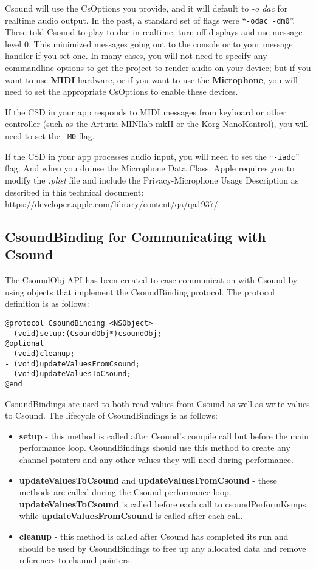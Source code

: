 \documentclass[11pt]{article}
\begin{document}
Csound will use the CsOptions you provide, and it will default to \textit{-o dac} for realtime audio output. In the past, a standard set of flags were ``{\tt -odac -dm0}''. These told Csound to play to dac in realtime, turn off displays and use message level 0.  This minimized messages going out to the console or to your message handler if you set one. In many cases, you will not need to specify any commandline options to get the project to render audio on your device; but if you want to use \textbf{MIDI} hardware, or if you want to use the \textbf{Microphone}, you will need to set the appropriate CsOptions to enable these devices.  

If the CSD in your app responds to MIDI messages from keyboard or other controller (such as the Arturia MINIlab mkII or the Korg NanoKontrol),  you will need to set the {\tt -M0} flag. 

If the CSD in your app processes audio input, you will need to set the ``{\tt -iadc}'' flag. And when you do use the Microphone Data Class, Apple requires you to modify the \textit{.plist} file and include the Privacy-Microphone Usage Description as described in this technical document: \url{https://developer.apple.com/library/content/qa/qa1937/}


\subsection{CsoundBinding for Communicating with Csound}

The CsoundObj API has been created to ease communication with Csound by using objects that implement the CsoundBinding protocol.  The protocol definition is as follows:

\begin{lstlisting}[caption=CsoundBinding Protocol Definition]
@protocol CsoundBinding <NSObject>
- (void)setup:(CsoundObj*)csoundObj;
@optional
- (void)cleanup;
- (void)updateValuesFromCsound;
- (void)updateValuesToCsound;
@end
\end{lstlisting}

CsoundBindings are used to both read values from Csound as well as write values to Csound.  The lifecycle of CsoundBindings is as follows:

\begin{itemize}
\item \textbf{setup} - this method is called after Csound's compile call but before the main performance loop. CsoundBindings should use this method to create any channel pointers and any other values they will need during performance.
\item \textbf{updateValuesToCsound} and \textbf{updateValuesFromCsound} - these methods are called during the Csound performance loop. \textbf{updateValuesToCsound} is called before each call to csoundPerformKsmps, while \textbf{updateValuesFromCsound} is called after each call.
\item \textbf{cleanup} - this method is called after Csound has completed its run and should be used by CsoundBindings to free up any allocated data and remove references to channel pointers.
\end{itemize}
\end{document}
